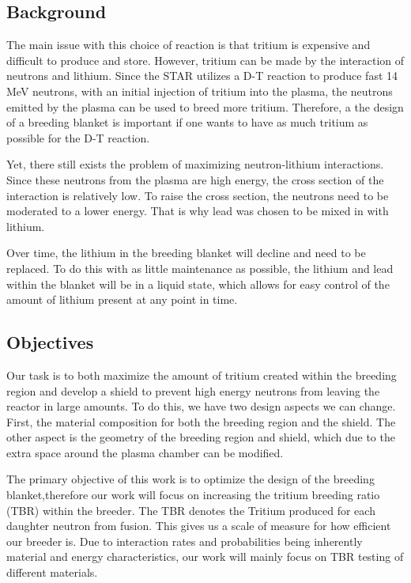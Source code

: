 \documentclass[runningheads]{llncs}
\begin{document}
\subsection{Background}
\hspace{0.5cm} 
The main issue with this choice of reaction is that tritium is expensive and difficult to produce and store. However, tritium can be made by the interaction of neutrons and lithium. Since the STAR utilizes a D-T reaction to produce fast 14 MeV neutrons, with an initial injection of tritium into the plasma, the neutrons emitted by the plasma can be used to breed more tritium. Therefore, a the design of a breeding blanket is important if one wants to have as much tritium as possible for the D-T reaction. 

Yet, there still exists the problem of maximizing neutron-lithium interactions. Since these neutrons from the plasma are high energy, the cross section of the interaction is relatively low. To raise the cross section, the neutrons need to be moderated to a lower energy. That is why lead was chosen to be mixed in with lithium.

Over time, the lithium in the breeding blanket will decline and need to be replaced. To do this with as little maintenance as possible, the lithium and lead within the blanket will be in a liquid state, which allows for easy control of the amount of lithium present at any point in time.
\subsection{Objectives}
\hspace{0.5cm} 
Our task is to both maximize the amount of tritium created within the breeding region and develop a shield to prevent high energy neutrons from leaving the reactor in large amounts. To do this, we have two design aspects we can change. First, the material composition for both the breeding region and the shield. The other aspect is the geometry of the breeding region and shield, which due to the extra space around the plasma chamber can be modified.

The primary objective of this work is to optimize the design of the breeding blanket,therefore our work will focus on increasing the tritium breeding ratio (TBR) within the breeder. The TBR denotes the Tritium produced for each daughter neutron from fusion. This gives us a scale of measure for how efficient our breeder is. Due to interaction rates and probabilities being inherently material and energy characteristics, our work will mainly focus on TBR testing of different materials.
\end{document}
